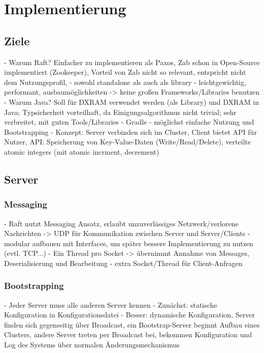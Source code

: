 \chapter{Implementierung}
\label{impl}

\section{Ziele}

- Warum Raft? Einfacher zu implementieren als Paxos, Zab schon in Open-Source implementiert (Zookeeper), Vorteil von Zab nicht so relevant, entspricht nicht dem Nutzungsprofil, 
- sowohl standalone als auch als library
- leichtgewichtig, performant, ausbaumöglichkeiten -> keine großen Frameworks/Libraries benutzen
- Warum Java? Soll für DXRAM verwendet werden (als Library) und DXRAM in Java; Typsicherheit vorteilhaft, da Einigungsalgorithmus nicht trivial; sehr verbreitet, mit guten Tools/Libraries
- Gradle
- möglichst einfache Nutzung und Bootstrapping
- Konzept: Server verbinden sich im Cluster, Client bietet API für Nutzer, API: Speicherung von Key-Value-Daten (Write/Read/Delete), verteilte atomic integers (mit atomic incrment, decrement)

\section{Server}

\subsection{Messaging}

- Raft nutzt Messaging Ansatz, erlaubt unzuverlässiges Netzwerk/verlorene Nachrichten -> UDP für Kommunikation zwischen Server und Server/Clients
- modular aufbauen mit Interfaces, um später bessere Implementierung zu nutzen (evtl. TCP...)
- Ein Thread pro Socket -> übernimmt Annahme von Messages, Deserialisierung und Bearbeitung
- extra Socket/Thread für Client-Anfragen


\subsection{Bootstrapping}

- Jeder Server muss alle anderen Server kennen
- Zunächst: statische Konfiguration in Konfigurationsdatei
- Besser: dynamische Konfiguration, Server finden sich gegenseitig über Broadcast, ein Bootstrap-Server beginnt Aufbau eines Clusters, andere Server treten per Broadcast bei, bekommen Konfiguration und Log des Systems über normalen Änderungsmechanismus

